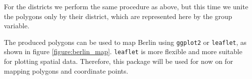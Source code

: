 For the districts we perform the same procedure as above, but this time we unite the polygons only by their district, which are represented here by the group variable.



The produced polygons can be used to map Berlin using \texttt{ggplot2} or \texttt{leaflet}, as shown in figure \ref{figure:berlin_map}. \texttt{leaflet} is more flexible and more suitable for plotting spatial data. Therefore, this package will be used for now on for mapping polygons and coordinate points.


